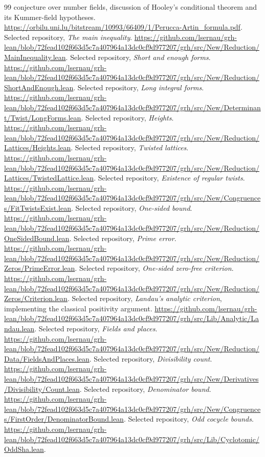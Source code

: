 \documentclass[11pt,letterpaper]{article}
\theoremstyle{definition}\newtheorem{definition}[theorem]{Definition}
\theoremstyle{remark}\newtheorem{remark}[theorem]{Remark}
\begin{document}
\begin{thebibliography}{99}
{conjecture over number fields}, discussion of Hooley's conditional theorem and its Kummer-field
hypotheses. \url{https://orbilu.uni.lu/bitstream/10993/66409/1/Perucca-Artin_formula.pdf}.
 Selected repository, \emph{The main inequality}.
\url{https://github.com/lsernau/grh-lean/blob/72fead102f663d5c7a407964a13dc0cf9d977207/grh/src/New/Reduction/MainInequality.lean}.
 Selected repository, \emph{Short and enough forms}.
\url{https://github.com/lsernau/grh-lean/blob/72fead102f663d5c7a407964a13dc0cf9d977207/grh/src/New/Reduction/ShortAndEnough.lean}.
 Selected repository, \emph{Long integral forms}.
\url{https://github.com/lsernau/grh-lean/blob/72fead102f663d5c7a407964a13dc0cf9d977207/grh/src/New/Determinant/Twist/LongForms.lean}.
 Selected repository, \emph{Heights}.
\url{https://github.com/lsernau/grh-lean/blob/72fead102f663d5c7a407964a13dc0cf9d977207/grh/src/New/Reduction/Lattices/Heights.lean}.
 Selected repository, \emph{Twisted lattices}.
\url{https://github.com/lsernau/grh-lean/blob/72fead102f663d5c7a407964a13dc0cf9d977207/grh/src/New/Reduction/Lattices/TwistedLattice.lean}.
 Selected repository, \emph{Existence of regular twists}.
\url{https://github.com/lsernau/grh-lean/blob/72fead102f663d5c7a407964a13dc0cf9d977207/grh/src/New/Congruences/FitTwistsExist.lean}.
 Selected repository, \emph{One-sided bound}.
\url{https://github.com/lsernau/grh-lean/blob/72fead102f663d5c7a407964a13dc0cf9d977207/grh/src/New/Reduction/OneSidedBound.lean}.
 Selected repository, \emph{Prime error}.
\url{https://github.com/lsernau/grh-lean/blob/72fead102f663d5c7a407964a13dc0cf9d977207/grh/src/New/Reduction/Zeros/PrimeError.lean}.
 Selected repository, \emph{One-sided zero-free criterion}.
\url{https://github.com/lsernau/grh-lean/blob/72fead102f663d5c7a407964a13dc0cf9d977207/grh/src/New/Reduction/Zeros/Criterion.lean}.
 Selected repository, \emph{Landau's analytic criterion}, implementing the
classical positivity argument.
\url{https://github.com/lsernau/grh-lean/blob/72fead102f663d5c7a407964a13dc0cf9d977207/grh/src/Lib/Analytic/Landau.lean}.
 Selected repository, \emph{Fields and places}.
\url{https://github.com/lsernau/grh-lean/blob/72fead102f663d5c7a407964a13dc0cf9d977207/grh/src/New/Reduction/Data/FieldsAndPlaces.lean}.
 Selected repository, \emph{Divisibility count}.
\url{https://github.com/lsernau/grh-lean/blob/72fead102f663d5c7a407964a13dc0cf9d977207/grh/src/New/Derivatives/Divisibility/Count.lean}.
 Selected repository, \emph{Denominator bound}.
\url{https://github.com/lsernau/grh-lean/blob/72fead102f663d5c7a407964a13dc0cf9d977207/grh/src/New/Congruences/FirstOrder/DenominatorBound.lean}.
 Selected repository, \emph{Odd cocycle bounds}.
\url{https://github.com/lsernau/grh-lean/blob/72fead102f663d5c7a407964a13dc0cf9d977207/grh/src/Lib/Cyclotomic/OddSha.lean}.
\end{thebibliography}
\end{document}
